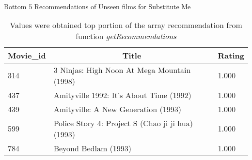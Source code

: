\begin{table}[!htbp]
	\caption{Bottom 5 Recommendations of Unseen films for Substitute Me} \label{tab:bottom-unseen}
	\begin{center}
	\vspace{-5mm}
		\begin{tabular}{ l l l }
			\hline
			\multicolumn{1}{c}{Movie\_id} & \multicolumn{1}{c}{Title} & \multicolumn{1}{c}{Rating}\\
			\hline
			314    & 3 Ninjas: High Noon At Mega Mountain (1998)       &     1.000\\
			437    & Amityville 1992: It's About Time (1992)           &     1.000\\
			439    & Amityville: A New Generation (1993)               &     1.000\\
			599    & Police Story 4: Project S (Chao ji ji hua) (1993) &     1.000\\
			784    & Beyond Bedlam (1993)                              &     1.000\\
			\hline
		\end{tabular}
	\caption*{\scriptsize Values were obtained top portion of the array recommendation from function \textit{getRecommendations}}
	 \end{center}
\end{table}